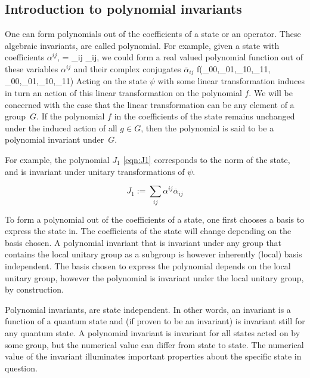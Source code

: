 \subsection*{Introduction to polynomial invariants}
\label{sec:comdef1}

One can form polynomials out of the coefficients of a state or an
operator.  These algebraic invariants, are called polynomial.  For example, given a state with coefficients
$\alpha^{ij}$,
\be 
\psi = \sum_{ij} \alpha_{ij},
\ee 
we could form a real valued polynomial function out of these variables $\alpha^{ij}$ and their complex conjugates $\overline \alpha_{ij}$ 
\be 
f(\alpha_{00},\alpha_{01},\alpha_{10},\alpha_{11}, \overline \alpha_{00},\overline \alpha_{01},\overline \alpha_{10},\overline \alpha_{11})
\ee 
Acting on the state $\psi$ with some linear transformation induces in turn an action 
of this linear transformation on the polynomial $f$.  We will be concerned with the case that the linear transformation can be any element of a group~$G$.  If the polynomial $f$ in the coefficients of the state remains unchanged 
under the induced action of all $g\in G$, then the polynomial is said to be a polynomial invariant under~$G$.


For example, the polynomial $J_1$ \eqref{eqn:J1} corresponds to the norm of the state, and is invariant under unitary transformations of $\psi$. 

\begin{equation}\label{eqn:J1}  
J_1 :=  \sum_{ij} \alpha^{ij}\overline{\alpha}_{ij} 
\end{equation} 

\begin{remark}
To form a polynomial out of the coefficients of a state, one first chooses a basis to express the state in.  The coefficients of the state will change depending on the basis chosen.  A polynomial invariant that is invariant under any group that contains the local unitary group as a subgroup is however inherently (local) basis independent.  The basis chosen to express the polynomial depends on the local unitary group, however the polynomial is invariant under the local unitary group, by construction. 
\end{remark}

\begin{remark}\label{re:invariance}  
Polynomial invariants, are state independent.  In other words, an invariant is a function of a quantum state and (if proven to be an invariant) is invariant still for any quantum state.  A polynomial invariant is invariant for all states acted on by some group, but the numerical value can differ from state to state.  The numerical value of the invariant illuminates important properties about the specific state in question.  
\end{remark}



